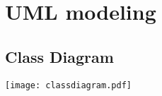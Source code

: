 \pagebreak
\section{UML modeling}
\subsection{Class Diagram}
\centerline{
	\vspace{0.2in}
    \texttt{[image: classdiagram.pdf]}
}
